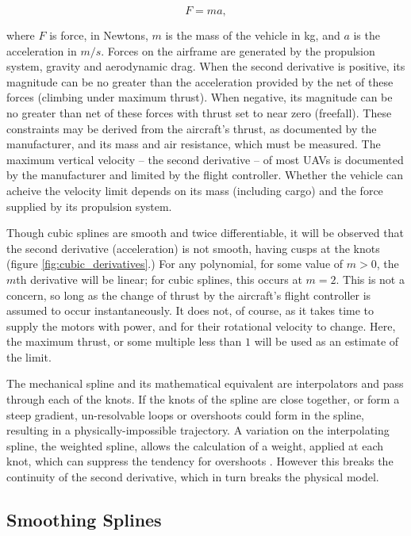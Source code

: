 \documentclass[doc]{apa6}
\begin{document}
\begin{equation}
F = ma,
\end{equation} 

where $F$ is force, in Newtons, $m$ is the mass of the vehicle in kg, and $a$ is the acceleration in $m/s$. Forces on the airframe are generated by the propulsion system, gravity and aerodynamic drag. When the second derivative is positive, its magnitude can be no greater than the acceleration provided by the net of these forces (climbing under maximum thrust). When negative, its magnitude can be no greater than net of these forces with thrust set to near zero (freefall). These constraints may be derived from the aircraft's thrust, as documented by the manufacturer, and its mass and air resistance, which must be measured. The maximum vertical velocity -- the second derivative -- of most UAVs is documented by the manufacturer and limited by the flight controller. Whether the vehicle can acheive the velocity limit depends on its mass (including cargo) and the force supplied by its propulsion system.

Though cubic splines are smooth and twice differentiable, it will be observed that the second derivative (acceleration) is not smooth, having cusps at the knots (figure \ref{fig:cubic_derivatives}.) For any polynomial, for some value of $m > 0$, the $m$th derivative will be linear; for cubic splines, this occurs at $m = 2$. This is not a concern, so long as the change of thrust by the aircraft's flight controller is assumed to occur instantaneously. It does not, of course, as it takes time to supply the motors with power, and for their rotational velocity to change. Here, the maximum thrust, or some multiple less than $1$ will be used as an estimate of the limit.

The mechanical spline and its mathematical equivalent are interpolators and pass through each of the knots. If the knots of the spline are close together, or form a steep gradient, un-resolvable loops or overshoots could form in the spline, resulting in a physically-impossible trajectory. A variation on the interpolating spline, the weighted spline, allows the calculation of a weight, applied at each knot, which can suppress the tendency for overshoots \parencite{lancaster1986curve}. However this breaks the continuity of the second derivative, which in turn breaks the physical model.


\subsection{Smoothing Splines}
\end{document}
